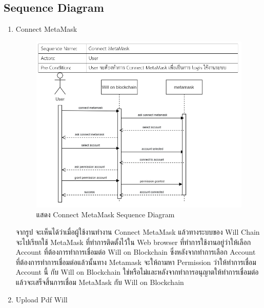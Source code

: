 \documentclass[12pt,oneside,openright,a4paper]{cpe-thai-project}
\begin{document}
\subsection{Sequence Diagram}
	\begin{enumerate}[label=\thesubsection.\arabic*,leftmargin=0pt,itemindent=2.5cm]
	\item Connect MetaMask
		\begin{figure}[!thb]
			\centering
			\includegraphics[scale=0.6]{connectMetamaskSeq}
			\caption{แสดง Connect MetaMask Sequence Diagram}
		\end{figure}
		\FloatBarrier
	\tab จากรูป จะเห็นได้ว่าเมื่อผู้ใช้งานทํางาน Connect MetaMask แล้วทางระบบของ Will Chain จะไปเรียกใช้ MetaMask ที่ทําการติดตั้งไว้ใน Web browser ที่ทําการใช้งานอยู่ว่าให้เลือก Account ที่ต้องการทําการเชื่อมต่อ Will on Blockchain ซึ่งหลังจากทําการเลือก Account ที่ต้องการทําการเชื่อมต่อแล้วนั้นทาง Metamask จะให้ถามหา Permission ว่าให้ทําการเชื่อม Account นี้ กับ Will on Blockchain ใช่หรือไม่และหลังจากทําการอนุญาตให้ทําการเชื่อมต่อแล้วจะเสร็จสิ้นการเชื่อม MetaMask กับ Will on Blockchain
	\item Upload Pdf Will
		\begin{figure}[!thb]
			\centering

\end{figure}
\end{enumerate}
\end{document}
